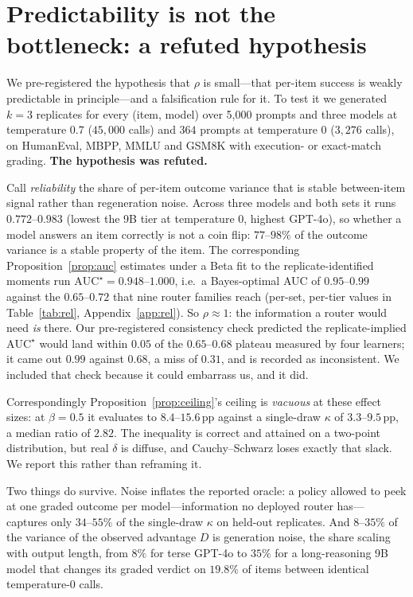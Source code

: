 \documentclass[10pt]{article}
\newcommand{\pp}{\,\text{pp}}
\begin{document}
\section{Predictability is not the bottleneck: a refuted hypothesis}\label{sec:ceiling}

We pre-registered the hypothesis that $\rho$ is small---that per-item success is
weakly predictable in principle---and a falsification rule for it. To test it we
generated $k=3$ replicates for every (item, model) over 5{,}000 prompts and three
models at temperature $0.7$ ($45{,}000$ calls) and $364$ prompts at temperature
$0$ ($3{,}276$ calls), on HumanEval, MBPP, MMLU and GSM8K with execution- or
exact-match grading. \textbf{The hypothesis was refuted.}

Call \emph{reliability} the share of per-item outcome variance that is stable
between-item signal rather than regeneration noise. Across three models and both
sets it runs $0.772$--$0.983$ (lowest the 9B tier at temperature $0$, highest
GPT-4o), so whether a model answers an item correctly is not a coin flip:
$77$--$98\%$ of the outcome variance is a stable property of the item. The
corresponding Proposition~\ref{prop:auc} estimates under a Beta fit to the
replicate-identified moments run $\mathrm{AUC}^\star=0.948$--$1.000$, i.e.\ a
Bayes-optimal AUC of $0.95$--$0.99$ against the $0.65$--$0.72$ that nine router
families reach (per-set, per-tier values in Table~\ref{tab:rel},
Appendix~\ref{app:rel}). So $\rho\approx1$: the information a router would need
\emph{is} there. Our pre-registered consistency
check predicted the replicate-implied $\mathrm{AUC}^\star$ would land within
$0.05$ of the $0.65$--$0.68$ plateau measured by four learners; it came out
$0.99$ against $0.68$, a miss of $0.31$, and is recorded as inconsistent. We
included that check because it could embarrass us, and it did.

Correspondingly Proposition~\ref{prop:ceiling}'s ceiling is \emph{vacuous} at
these effect sizes: at $\beta=0.5$ it evaluates to $8.4$--$15.6\pp$ against a
single-draw $\kappa$ of $3.3$--$9.5\pp$, a median ratio of $2.82$. The
inequality is correct and attained on a two-point distribution, but real
$\delta$ is diffuse, and Cauchy--Schwarz loses exactly that slack. We report
this rather than reframing it.

Two things do survive. Noise inflates the reported oracle: a policy allowed to
peek at one graded outcome per model---information no deployed router has---
captures only $34$--$55\%$ of the single-draw $\kappa$ on held-out replicates.
And $8$--$35\%$ of the variance of the observed advantage $D$ is generation
noise, the share scaling with output length, from $8\%$ for terse GPT-4o to
$35\%$ for a long-reasoning 9B model that changes its graded verdict on
$19.8\%$ of items between identical temperature-$0$ calls.
\end{document}
